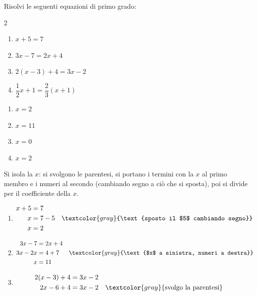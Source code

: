 
\begin{question}[ID=2.1, subtitle={Equazioni di primo grado}, difficulty=facile, tags={equazioni lineari}]
Risolvi le seguenti equazioni di primo grado:
\begin{multicols}{2}
\begin{enumerate}[leftmargin=3cm]
    \item $x + 5 = 7$
    \item $3x - 7 = 2x + 4$
    \item $2(x - 3) + 4 = 3x - 2$
    \item $\dfrac{1}{2}x + 1 = \dfrac{2}{3}(x + 1)$
\end{enumerate}
\end{multicols}
\begin{solution}
\begin{enumerate}
    \item $x=2$
    \item $x=11$
    \item $x=0$
    \item $x=2$
\end{enumerate}
\end{solution}
\begin{explanation}
Si isola la $x$: si svolgono le parentesi, si portano i termini con la $x$ al primo membro e i numeri al secondo (cambiando segno a ciò che si sposta), poi si divide per il coefficiente della $x$.
\begin{enumerate}
    \item \[\begin{aligned}
    x+5 &= 7\\
    x &= 7-5 && \textcolor{gray}{\text{sposto il $5$ cambiando segno}}\\
    x &= 2
    \end{aligned}\]
    \item \[\begin{aligned}
    3x-7 &= 2x+4\\
    3x-2x &= 4+7 && \textcolor{gray}{\text{$x$ a sinistra, numeri a destra}}\\
    x &= 11
    \end{aligned}\]
    \item \[\begin{aligned}
    2(x-3)+4 &= 3x-2\\
    2x-6+4 &= 3x-2 && \textcolor{gray}{\text{svolgo la parentesi}}\\

\end{aligned}\]
\end{enumerate}
\end{explanation}
\end{question}
